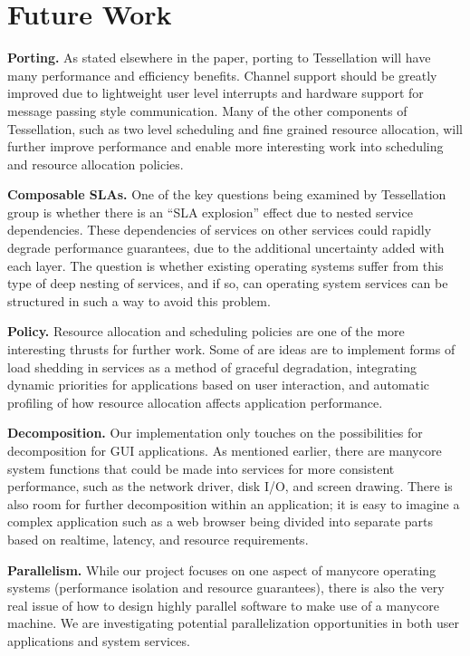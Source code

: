 \documentclass[letterpaper,twocolumn,11pt]{article}
\begin{document}
\section{Future Work}

\textbf{Porting.} As stated elsewhere in the paper, porting to Tessellation will have many performance and efficiency benefits. Channel support should be greatly improved due to lightweight user level interrupts and hardware support for message passing style communication. Many of the other components of Tessellation, such as two level scheduling and fine grained resource allocation, will further improve performance and enable more interesting work into scheduling and resource allocation policies.

\textbf{Composable SLAs.} One of the key questions being examined by Tessellation group is whether there is an ``SLA explosion'' effect due to nested service dependencies. These dependencies of services on other services could rapidly degrade performance guarantees, due to the additional uncertainty added with each layer. The question is whether existing operating systems suffer from this type of deep nesting of services, and if so, can operating system services can be structured in such a way to avoid this problem.

\textbf{Policy.} Resource allocation and scheduling policies are one of the more interesting thrusts for further work. Some of are ideas are to implement forms of load shedding in services as a method of graceful degradation, integrating dynamic priorities for applications based on user interaction, and automatic profiling of how resource allocation affects application performance.

\textbf{Decomposition.} Our implementation only touches on the possibilities for decomposition for GUI applications. As mentioned earlier, there are manycore system functions that could be made into services for more consistent performance, such as the network driver, disk I/O, and screen drawing. There is also room for further decomposition within an application; it is easy to imagine a complex application such as a web browser being divided into separate parts based on realtime, latency, and resource requirements.

\textbf{Parallelism.} While our project focuses on one aspect of manycore operating systems (performance isolation and resource guarantees), there is also the very real issue of how to design highly parallel software to make use of a manycore machine. We are investigating potential parallelization opportunities in both user applications and system services.
\end{document}
